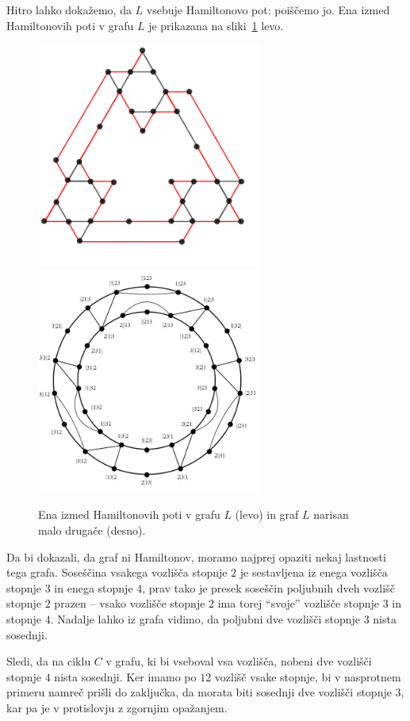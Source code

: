 \documentclass[twoside,11pt]{article}
\begin{document}
\begin{dokaz}
Hitro lahko dokažemo, da $L$ vsebuje Hamiltonovo pot: poiščemo jo. Ena izmed Hamiltonovih poti v grafu $L$ je prikazana na sliki~\ref{fig:dokaz-ham-klasicni} levo.

\begin{figure}
    \centering
    \includegraphics[width=210pt]{img/classic-tolgraph-ham-path.png}
    \includegraphics[width=210pt]{img/classic-tolgraph-hamcycle.png}
    \caption{Ena izmed Hamiltonovih poti v grafu $L$ (levo) in graf $L$ narisan malo drugače (desno).}
    \label{fig:dokaz-ham-klasicni}
\end{figure}

Da bi dokazali, da graf ni Hamiltonov, moramo najprej opaziti nekaj lastnosti tega grafa. Soseščina vsakega vozlišča stopnje $2$ je sestavljena iz enega vozlišča stopnje $3$ in enega stopnje $4$, prav tako je presek soseščin poljubnih dveh vozlišč stopnje $2$ prazen -- vsako vozlišče stopnje $2$ ima torej ``svoje'' vozlišče stopnje $3$ in stopnje $4$. Nadalje lahko iz grafa vidimo, da poljubni dve vozlišči stopnje $3$ nista sosednji.

Sledi, da na ciklu $C$ v grafu, ki bi vseboval vsa vozlišča, nobeni dve vozlišči stopnje $4$ nista sosednji. Ker imamo po $12$ vozlišč vsake stopnje, bi v nasprotnem primeru namreč prišli do zaključka, da morata biti sosednji dve vozlišči stopnje $3$, kar pa je v protislovju z zgornjim opažanjem.


\end{dokaz}
\end{document}
